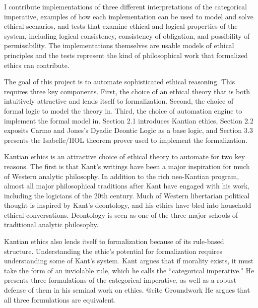\begin{isabellebody}
\begin{isamarkuptext}
I contribute implementations of three different interpretations of the categorical imperative, 
examples of how each implementation can be used to model and solve ethical scenarios, and tests that
examine ethical and logical properties of the system, including logical consistency, consistency
of obligation, and possibility of permissibility. The implementations themselves are usable models 
of ethical principles and the tests represent the kind of philosophical work that formalized ethics 
can contribute.%
\end{isamarkuptext}\isamarkuptrue%
%
\isadelimdocument
%
\endisadelimdocument
%
\isatagdocument
%
\isamarkuptrue%
%
\endisatagdocument
{\isafolddocument}%
%
\isadelimdocument
%
\endisadelimdocument
%
\begin{isamarkuptext}%
The goal of this project is to automate sophisticated ethical reasoning. This requires three
key components. First, the choice of an ethical theory that is both intuitively attractive and 
lends itself to formalization. Second, the choice of formal logic to model the theory in. Third, the 
choice of automation engine to implement the formal model in. Section 2.1 introduces Kantian
ethics, Section 2.2 exposits Carmo and Jones's Dyadic Deontic Logic \cite{CJDDL} as a 
base logic, and Section 3.3 presents the Isabelle/HOL theorem prover used to implement the 
formalization.%
\end{isamarkuptext}\isamarkuptrue%
%
\isadelimdocument
%
\endisadelimdocument
%
\isatagdocument
%
\isamarkuptrue%
%
\endisatagdocument
{\isafolddocument}%
%
\isadelimdocument
%
\endisadelimdocument
%
\begin{isamarkuptext}%
Kantian ethics is an attractive choice of ethical theory to automate for two key reasons. The 
first is that Kant's writings have been a major inspiration for much of Western analytic philosophy. 
In addition to the rich neo-Kantian program, almost all major philosophical traditions after Kant have
engaged with his work, including the logicians of the 20th century. Much of Western libertarian
political thought is inspired by Kant's deontology, and his ethics have bled into household ethical 
conversations. Deontology is seen as one of the three major schools of traditional analytic philosophy.

Kantian ethics also lends itself to formalization because of its rule-based structure. Understanding 
the ethic's potential for formalization requires understanding some of Kant's system. Kant argues 
that if morality exists, it must take the form of an inviolable rule, which he calls the ``categorical
imperative." He presents three formulations of the categorical imperative, as well as a robust defense
of them in his seminal work on ethics. {@cite Groundwork} He argues that all three formulations are 
equivalent. 


\end{isamarkuptext}
\end{isabellebody}
